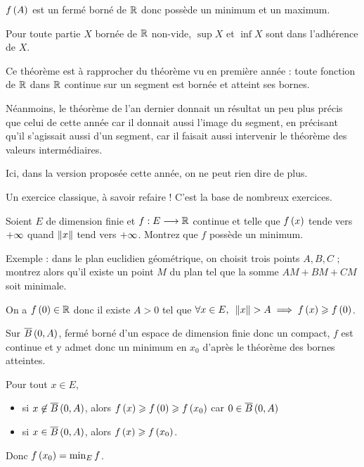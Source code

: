 \begin{dem}
\(f\left(A\right)\) est un fermé borné de \(\mathbb{R}\) donc possède un minimum et un maximum.
\end{dem}

\begin{rem}
Pour toute partie \(X\) bornée de \(\mathbb{R}\) non-vide, \(\sup X\) et \(\inf X\) sont dans l'adhérence de \(X\).
\end{rem}

\begin{rem}
Ce théorème est à rapprocher du théorème vu en première année : toute fonction de \(\mathbb{R}\) dans \(\mathbb{R}\) continue sur un segment est bornée et atteint ses bornes.

Néanmoins, le théorème de l'an dernier donnait un résultat un peu plus précis que celui de cette année car il donnait aussi l'image du segment, en précisant qu'il s'agissait aussi d'un segment, car il faisait aussi intervenir le théorème des valeurs intermédiaires.

Ici, dans la version proposée cette année, on ne peut rien dire de plus.
\end{rem}

\begin{exo}
Un exercice classique, à savoir refaire ! C'est la base de nombreux exercices.

Soient \(E\) de dimension finie et \(f:E\longrightarrow\mathbb{R}\) continue et telle que \(f\left(x\right)\) tende vers \(+\infty\) quand \(\norme{x}\) tend vers \(+\infty\). Montrez que \(f\) possède un minimum.

Exemple : dans le plan euclidien géométrique, on choisit trois points \(A,B,C\) ; montrez alors qu'il existe un point \(M\) du plan tel que la somme \(AM+BM+CM\) soit minimale.
\end{exo}

\begin{corr}
On a \(f\left(0\right)\in\mathbb{R}\) donc il existe \(A>0\) tel que \(\quantifs{\forall x\in E}\norme{x}>A\imp f\paren{x}\geq f\paren{0}\).

Sur \(\boulef{0}{A}\), fermé borné d'un espace de dimension finie donc un compact, \(f\) est continue et y admet donc un minimum en \(x_0\) d'après le théorème des bornes atteintes.

Pour tout \(x\in E\),

\begin{itemize}
    \item si \(x\not\in\boulef{0}{A}\), alors \(f\left(x\right)\geqslant f\left(0\right)\geqslant f\left(x_0\right)\) car \(0\in\boulef{0}{A}\) \\
    \item si \(x\in\boulef{0}{A}\), alors \(f\left(x\right)\geqslant f\left(x_0\right)\).
\end{itemize}

Donc \(f\left(x_0\right)=\min_Ef\).
\end{corr}

